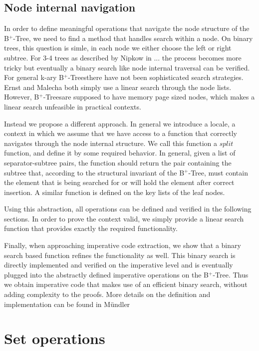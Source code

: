 \documentclass[a4paper,UKenglish,cleveref, autoref, thm-restate]{lipics-v2021}
\newcommand{\btree}{B$^+$-Tree}
\newcommand{\btrees}{B$^+$-Trees}
\begin{document}
\subsection{Node internal navigation}
\label{sec:split}

In order to define meaningful operations that navigate
the node structure of the \btree,
we need to find a method that handles search within a node.
On binary trees, this question is simle, in each node we either choose
the left or right subtree.
For 3-4 trees as described by Nipkow in ... the process becomes more tricky %
but eventually a binary search like node internal traversal can be verified.
For general k-ary \btrees there have not been sophisticated search strategies.
Ernst and Malecha %
both simply use a linear search through the node lists.
However, \btrees are supposed to have memory page sized nodes, 
which makes a linear search unfeasible in practical contexts.

Instead we propose a different approach.
In general we introduce a locale, a context in which we assume that we
have access to a function that correctly navigates through the node internal structure.
We call this function a $split$ function, and define it by some required behavior.
In general, given a list of separator-subtree pairs, the function should
return the pair containing the subtree that, according to the structural invariant of the \btree,
must contain the element that is being searched for or will hold the element after correct insertion.
A similar function is defined on the key lists of the leaf nodes.

Using this abstraction, all operations can be defined and verified
in the following sections.
In order to prove the context valid, we simply provide a linear search function
that provides exactly the required functionality.

Finally, when approaching imperative code extraction,
we show that a binary search based function refines the
functionality as well.
This binary search is directly implemented and verified on the imperative
level and is eventually plugged into the abstractly defined
imperative operations on the \btree.
Thus we obtain imperative code that makes use of an efficient
binary search, without adding complexity to the proofs.
More details on the definition and implementation
can be found in Mündler %


\section{Set operations}
\label{sec:set}
\end{document}
